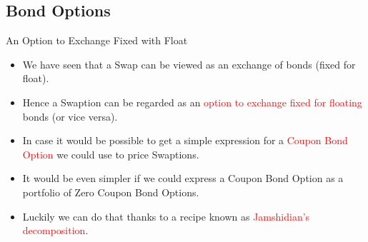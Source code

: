 \documentclass{beamer}
\begin{document}


\subsection{Bond Options}
\begin{frame}{An Option to Exchange Fixed with Float}
\begin{itemize}
	\item<1-> We have seen that a Swap can be viewed as an exchange of bonds (fixed for float).
	\item<2-> Hence a Swaption can be regarded as an \textcolor{red}{option to exchange fixed for floating} bonds (or vice versa).
	\item<3-> In case it would be possible to get a simple expression for a \textcolor{red}{Coupon Bond Option} we could use to price Swaptions.
	\item <4-> It would be even simpler if we could express a Coupon Bond Option as a portfolio of Zero Coupon Bond Options.
	\item<5-> Luckily we can do that thanks to a recipe known as \textcolor{red}{Jamshidian's decomposition}.
\end{itemize}
\end{frame}
\end{document}
